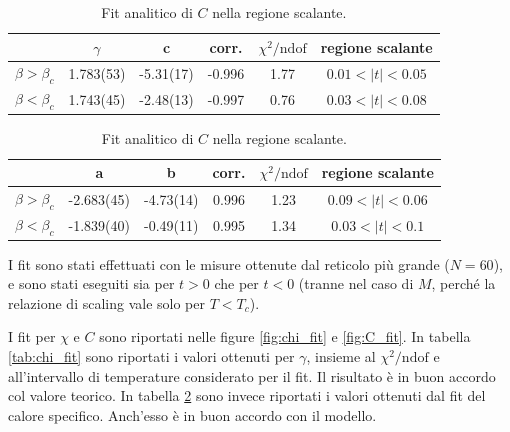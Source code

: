 \documentclass[a4paper,11pt]{article}
\newcommand{\chindof}{\chi^2 / \text{ndof}}
\begin{document}
	\begin{table}[bt]
        \centering
        \begin{tabular}{c | c c c c c } \hline 
                                  & $\gamma$  & c    & corr. & $\chindof$ & regione scalante \\ \hline
                $\beta > \beta_c$ & 1.783(53) & -5.31(17)   & -0.996    & 1.77 & $0.01 < |t| < 0.05$ \\
                $\beta < \beta_c$ & 1.743(45) & -2.48(13)   &   -0.997 & 0.76 & $0.03 < |t| < 0.08$ \\ \hline
        \end{tabular}
        \caption{Fit analitico di $\chi$ nella regione scalante.}
        \label{tab:chi_fit}
        \vspace{5mm}
        \centering
        \begin{tabular}{c | c c c c c } \hline 
                                  & a  & b    & corr. & $\chindof$ & regione scalante \\ \hline
                $\beta > \beta_c$ & -2.683(45) & -4.73(14)   & 0.996   & 1.23 & $0.09 < |t| < 0.06$ \\
                $\beta < \beta_c$ & -1.839(40) & -0.49(11)   & 0.995   & 1.34 & $0.03 < |t| < 0.1$ \\ \hline
        \end{tabular}
        \caption{Fit analitico di $C$ nella regione scalante.}
        \label{tab:C_fit}
	\end{table}
	
	I fit sono stati effettuati con le misure ottenute dal reticolo più grande ($N = 60$), e sono stati eseguiti sia per $t > 0$ che per $t < 0$ (tranne nel caso di $M$, perché la relazione di scaling vale solo per $T < T_c$).
	
	I fit per $\chi$ e $C$ sono riportati nelle figure \ref{fig:chi_fit} e \ref{fig:C_fit}. In tabella \ref{tab:chi_fit} sono riportati i valori ottenuti per $\gamma$, insieme al $\chi^2 / \text{ndof}$ e all'intervallo di temperature considerato per il fit. Il risultato è in buon accordo col valore teorico. In tabella \ref{tab:C_fit} sono invece riportati i valori ottenuti dal fit del calore specifico. Anch'esso è in buon accordo con il modello.
\end{document}
